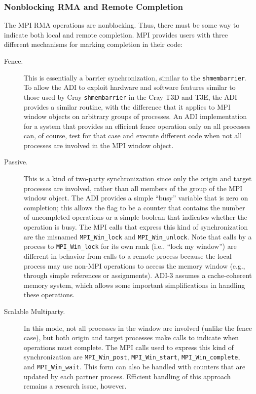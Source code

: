\documentclass{article}
\def\code#1{\texttt{#1}}
\begin{document}
\subsubsection{Nonblocking RMA and Remote Completion}
The MPI RMA operations are nonblocking.  Thus, there must be some way
to indicate both local and remote completion.  MPI provides users
with three different mechanisms for marking completion in their code:
\begin{description}
\item[Fence.]This is essentially a barrier synchronization, similar to
the \code{shmembarrier}.  To allow the ADI to exploit hardware and
software features similar to those used by Cray \code{shmembarrier} in the
Cray T3D and T3E, the ADI provides a similar routine, with the
difference that it applies to MPI window objects on arbitrary groups
of processes. An ADI implementation for a system that
provides an efficient fence operation only on all processes can, of
course, test for that case and execute different code when not all
processes are involved in the MPI window object.

\item[Passive.]This is a kind of two-party synchronization since only
the origin and target processes are involved, rather than all members of the
group of the MPI window object.  The ADI provides a
simple ``busy'' variable that is zero on completion; this allows the
flag to be a counter that contains the number of uncompleted
operations or a simple boolean that indicates whether the operation is
busy.  The MPI calls that express this kind of synchronization are the
misnamed 
\code{MPI_Win_lock} and \code{MPI_Win_unlock}.  Note that calls by a
process to \code{MPI_Win_lock} for its own rank (i.e., ``lock my
window'') are different in behavior from calls to a remote process
because the local process may use non-MPI operations to access the
memory window (e.g., through simple references or assignments).  ADI-3
assumes a cache-coherent memory system, which allows some important
simplifications in handling these operations.

\item[Scalable Multiparty.]In this mode, not all processes in the
window are involved (unlike the fence case), but both origin and
target processes make calls to indicate when operations must complete.
The MPI calls used to express this kind of synchronization are
\code{MPI_Win_post}, \code{MPI_Win_start}, \code{MPI_Win_complete},
and \code{MPI_Win_wait}.
This form can also be handled with counters that are updated by each
partner process.  Efficient handling of this approach remains a
research issue, however.
\end{description}
\end{document}
